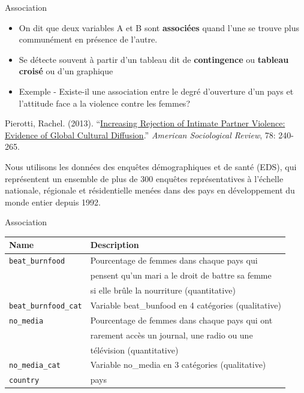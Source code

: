 \documentclass[ignorenonframetext,]{beamer}
\providecommand{\tightlist}{%
  \setlength{\itemsep}{0pt}\setlength{\parskip}{0pt}}
\begin{document}
\begin{frame}{Association}
\protect\hypertarget{association}{}

\begin{itemize}
\tightlist
\item
  On dit que deux variables A et B sont \textbf{associées} quand l'une
  se trouve plus communément en présence de l'autre.
\item
  Se détecte souvent à partir d'un tableau dit de \textbf{contingence}
  ou \textbf{tableau croisé} ou d'un graphique
\item
  Exemple - Existe-il une association entre le degré d'ouverture d'un
  pays et l'attitude face a la violence contre les femmes?
\end{itemize}

Pierotti, Rachel. (2013).
``\href{http://dx.doi.org/10.1177/0003122413480363}{Increasing Rejection
of Intimate Partner Violence: Evidence of Global Cultural Diffusion}.''
\emph{American Sociological Review}, 78: 240-265.

Nous utilisons les données des enquêtes démographiques et de santé
(EDS), qui représentent un ensemble de plus de 300 enquêtes
représentatives à l'échelle nationale, régionale et résidentielle menées
dans des pays en développement du monde entier depuis 1992.

\end{frame}

\begin{frame}[fragile]{Association}
\protect\hypertarget{association-1}{}

\begin{longtable}[]{@{}ll@{}}
\toprule
Name & Description\tabularnewline
\midrule
\endhead
\texttt{beat\_burnfood} & Pourcentage de femmes dans chaque pays
qui\tabularnewline
& pensent qu'un mari a le droit de battre sa femme\tabularnewline
& si elle brûle la nourriture (quantitative)\tabularnewline
\texttt{beat\_burnfood\_cat} & Variable beat\_bunfood en 4 catégories
(qualitative)\tabularnewline
\texttt{no\_media} & Pourcentage de femmes dans chaque pays qui
ont\tabularnewline
& rarement accès un journal, une radio ou une\tabularnewline
& télévision (quantitative)\tabularnewline
\texttt{no\_media\_cat} & Variable no\_media en 3 catégories
(qualitative)\tabularnewline
\texttt{country} & pays\tabularnewline
\bottomrule
\end{longtable}

\end{frame}
\end{document}
